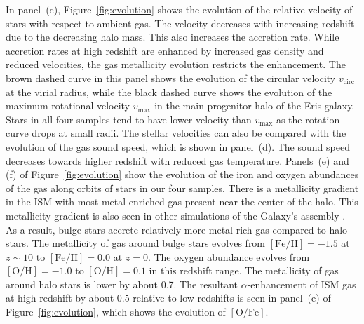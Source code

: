 \documentclass[a4paper,fleqn,usenatbib]{mnras}
\begin{document}
In panel~(c), Figure~\ref{fig:evolution} shows the evolution of the
relative velocity of stars with respect to ambient gas.  The velocity
decreases with increasing redshift due to the decreasing halo mass.
This also increases the accretion rate.  While accretion rates at high
redshift are enhanced by increased gas density and reduced velocities,
the gas metallicity evolution restricts the enhancement.  The brown
dashed curve in this panel shows the evolution of the circular
velocity $v_\mathrm{circ}$ at the virial radius, while the black
dashed curve shows the evolution of the maximum rotational velocity
$v_\mathrm{max}$ in the main progenitor halo of the Eris galaxy.
Stars in all four samples tend to have lower velocity than
$v_\mathrm{max}$ as the rotation curve drops at small radii.  The
stellar velocities can also be compared with the evolution of the gas
sound speed, which is shown in panel~(d).  The sound speed decreases
towards higher redshift with reduced gas temperature.  Panels~(e) and
(f) of Figure~\ref{fig:evolution} show the evolution of the iron and
oxygen abundances of the gas along orbits of stars in our four
samples.  There is a metallicity gradient in the ISM with most
metal-enriched gas present near the center of the halo.  This
metallicity gradient is also seen in other simulations of the Galaxy's
assembly \citep[e.g.,][]{2013MNRAS.436..625S}.  As a result, bulge
stars accrete relatively more metal-rich gas compared to halo stars.
The metallicity of gas around bulge stars evolves from
$[\mathrm{Fe}/\mathrm{H}]=-1.5$ at $z\sim 10$ to
$[\mathrm{Fe}/\mathrm{H}]=0.0$ at $z=0$.  The oxygen abundance evolves
from $[\mathrm{O}/\mathrm{H}]=-1.0$ to $[\mathrm{O}/\mathrm{H}]=0.1$
in this redshift range.  The metallicity of gas around halo stars is
lower by about 0.7.  The resultant $\alpha$-enhancement of ISM gas at
high redshift by about 0.5 relative to low redshifts is seen in
panel~(e) of Figure~\ref{fig:evolution}, which shows the evolution of
$[\mathrm{O}/\mathrm{Fe}]$.
\end{document}
